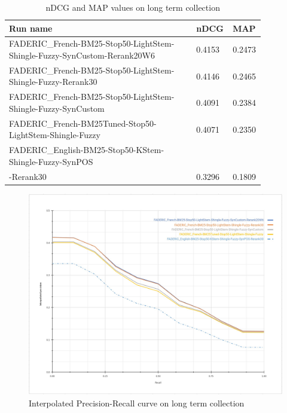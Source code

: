 \begin{table}[tbp]
\caption{\ac{nDCG} and \ac{MAP} values on long term collection}
  \label{tab:long-map-ndcg-table}
    \centering
    \begin{tabular}{|p{0.7\linewidth}|p{0.075\linewidth}|p{0.075\linewidth}|}
	\toprule
	\textbf{Run name} & \textbf{nDCG} & \textbf{MAP} \\
	\midrule
        FADERIC\_French-BM25-Stop50-LightStem-Shingle-Fuzzy-SynCustom-Rerank20W6 & 0.4153 & 0.2473 \\ 
        FADERIC\_French-BM25-Stop50-LightStem-Shingle-Fuzzy-Rerank30 & 0.4146 & 0.2465 \\ 
        FADERIC\_French-BM25-Stop50-LightStem-Shingle-Fuzzy-SynCustom & 0.4091 & 0.2384 \\ 
        FADERIC\_French-BM25Tuned-Stop50-LightStem-Shingle-Fuzzy & 0.4071 & 0.2350 \\ 
        FADERIC\_English-BM25-Stop50-KStem-Shingle-Fuzzy-SynPOS\\-Rerank30 & 0.3296 & 0.1809 \\ 
	\bottomrule
    \end{tabular}
\end{table}

\begin{figure}[tbp]
  \centering
  \includegraphics[width=1\linewidth]{figure/iprec-recall-LONG-TERM.jpg}
  \caption{Interpolated Precision-Recall curve on long term collection}
  \label{fig:precision-recall-curve-long-term}
\end{figure}

